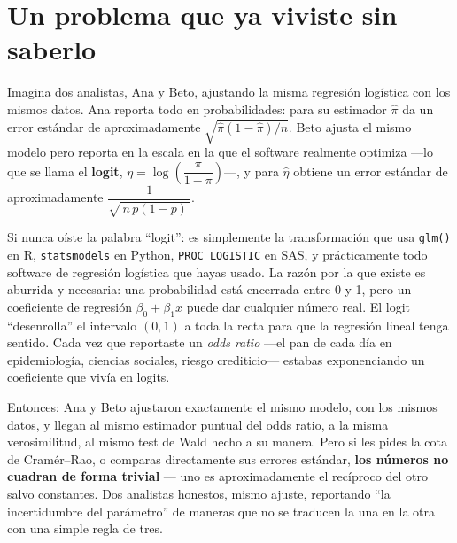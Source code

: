 \section*{Un problema que ya viviste sin saberlo}

Imagina dos analistas, Ana y Beto, ajustando la misma regresión logística con los mismos datos. Ana reporta todo en probabilidades: para su estimador $\widehat{\pi}$ da un error estándar de aproximadamente $\sqrt{\widehat{\pi}(1-\widehat{\pi})/n}$. Beto ajusta el mismo modelo pero reporta en la escala en la que el software realmente optimiza ---lo que se llama el \textbf{logit}, $\eta = \log\!\left(\dfrac{\pi}{1-\pi}\right)$---, y para $\widehat{\eta}$ obtiene un error estándar de aproximadamente $\dfrac{1}{\sqrt{\,n\,p(1-p)\,}}$.

Si nunca oíste la palabra ``logit'': es simplemente la transformación que usa \texttt{glm()} en R, \texttt{statsmodels} en Python, \texttt{PROC\ LOGISTIC} en SAS, y prácticamente todo software de regresión logística que hayas usado. La razón por la que existe es aburrida y necesaria: una probabilidad está encerrada entre 0 y 1, pero un coeficiente de regresión $\beta_0 + \beta_1 x$ puede dar cualquier número real. El logit ``desenrolla'' el intervalo $(0,1)$ a toda la recta para que la regresión lineal tenga sentido. Cada vez que reportaste un \emph{odds ratio} ---el pan de cada día en epidemiología, ciencias sociales, riesgo crediticio--- estabas exponenciando un coeficiente que vivía en logits.

Entonces: Ana y Beto ajustaron exactamente el mismo modelo, con los mismos datos, y llegan al mismo estimador puntual del odds ratio, a la misma verosimilitud, al mismo test de Wald hecho a su manera. Pero si les pides la cota de Cramér--Rao, o comparas directamente sus errores estándar, \textbf{los números no cuadran de forma trivial} --- uno es aproximadamente el recíproco del otro salvo constantes. Dos analistas honestos, mismo ajuste, reportando ``la incertidumbre del parámetro'' de maneras que no se traducen la una en la otra con una simple regla de tres.

